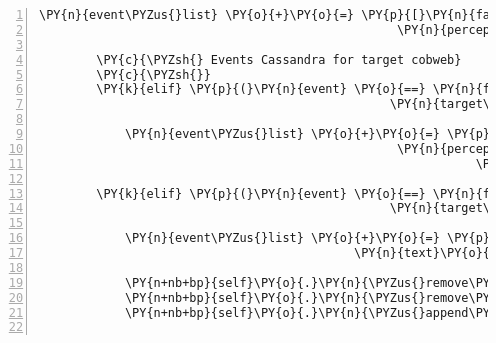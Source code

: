 \begin{Verbatim}[commandchars=\\\{\},numbers=left,firstnumber=1,stepnumber=1]
            \PY{n}{event\PYZus{}list} \PY{o}{+}\PY{o}{=} \PY{p}{[}\PY{n}{fabula}\PY{o}{.}\PY{n}{PerceptionEvent}\PY{p}{(}\PY{n}{identifier}\PY{o}{=}\PY{n}{ID\PYZus{}CASSANDRA}\PY{p}{,}
                                                  \PY{n}{perception}\PY{o}{=}\PY{l+s}{\PYZsq{}}\PY{l+s}{Der Abflugsort ist schon offen.}\PY{l+s}{\PYZsq{}}\PY{p}{)}\PY{p}{]}

        \PY{c}{\PYZsh{} Events Cassandra for target cobweb}
        \PY{c}{\PYZsh{}}
        \PY{k}{elif} \PY{p}{(}\PY{n}{event} \PY{o}{==} \PY{n}{fabula}\PY{o}{.}\PY{n}{TriesToLookAtEvent}\PY{p}{(}\PY{n}{identifier}\PY{o}{=}\PY{n}{ID\PYZus{}CASSANDRA}\PY{p}{,}
                                                 \PY{n}{target\PYZus{}identifier}\PY{o}{=}\PY{l+s}{\PYZsq{}}\PY{l+s}{cobweb}\PY{l+s}{\PYZsq{}}\PY{p}{)}\PY{p}{)}\PY{p}{:}

            \PY{n}{event\PYZus{}list} \PY{o}{+}\PY{o}{=} \PY{p}{[}\PY{n}{fabula}\PY{o}{.}\PY{n}{PerceptionEvent}\PY{p}{(}\PY{n}{identifier}\PY{o}{=}\PY{n}{ID\PYZus{}CASSANDRA}\PY{p}{,}
                                                  \PY{n}{perception}\PY{o}{=}\PY{l+s}{\PYZsq{}}\PY{l+s}{Ein sehr klebriger Spinnweb, }\PY{l+s}{\PYZsq{}}
                                                             \PY{l+s}{\PYZsq{}}\PY{l+s}{damit könnte man bestimmt gut etwas kleben.}\PY{l+s}{\PYZsq{}}\PY{p}{)}\PY{p}{]}

        \PY{k}{elif} \PY{p}{(}\PY{n}{event} \PY{o}{==} \PY{n}{fabula}\PY{o}{.}\PY{n}{TriesToPickUpEvent}\PY{p}{(}\PY{n}{identifier}\PY{o}{=}\PY{n}{ID\PYZus{}CASSANDRA}\PY{p}{,}
                                                 \PY{n}{target\PYZus{}identifier}\PY{o}{=}\PY{l+s}{\PYZsq{}}\PY{l+s}{cobweb}\PY{l+s}{\PYZsq{}}\PY{p}{)}\PY{p}{)}\PY{p}{:}

            \PY{n}{event\PYZus{}list} \PY{o}{+}\PY{o}{=} \PY{p}{[}\PY{n}{fabula}\PY{o}{.}\PY{n}{SaysEvent}\PY{p}{(}\PY{n}{identifier}\PY{o}{=}\PY{n}{ID\PYZus{}CASSANDRA}\PY{p}{,}
                                            \PY{n}{text}\PY{o}{=}\PY{l+s}{\PYZsq{}}\PY{l+s}{Hey, die Spinne bewegt sich!}\PY{l+s}{\PYZsq{}}\PY{p}{)}\PY{p}{]}

            \PY{n+nb+bp}{self}\PY{o}{.}\PY{n}{\PYZus{}remove\PYZus{}sentence}\PY{p}{(}\PY{n}{ID\PYZus{}KUNI}\PY{p}{,} \PY{l+s}{\PYZsq{}}\PY{l+s}{Hinter der Spinne ist doch irgendwas!}\PY{l+s}{\PYZsq{}}\PY{p}{)}
            \PY{n+nb+bp}{self}\PY{o}{.}\PY{n}{\PYZus{}remove\PYZus{}sentence}\PY{p}{(}\PY{n}{ID\PYZus{}CASSANDRA}\PY{p}{,} \PY{l+s}{\PYZsq{}}\PY{l+s}{Die Spinne verbirgt etwas!}\PY{l+s}{\PYZsq{}}\PY{p}{)}
            \PY{n+nb+bp}{self}\PY{o}{.}\PY{n}{\PYZus{}append\PYZus{}sentence}\PY{p}{(}\PY{n}{ID\PYZus{}CASSANDRA}\PY{p}{,} \PY{l+s}{\PYZsq{}}\PY{l+s}{Ich habe einen sehr feinen klebrigen Spinnweb dabei.}\PY{l+s}{\PYZsq{}}\PY{p}{)}


\end{Verbatim}
